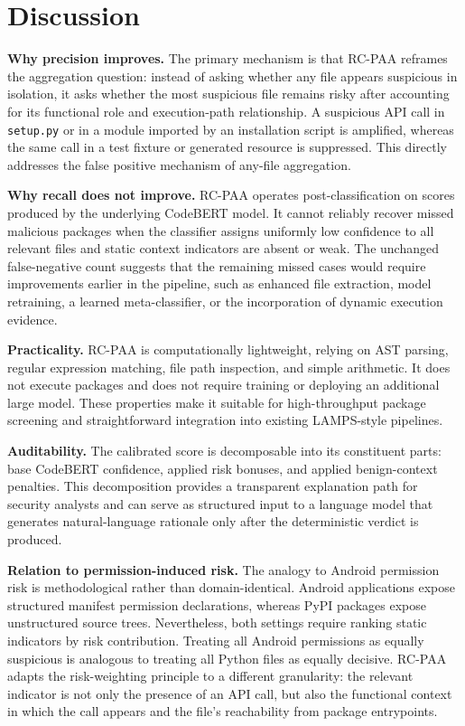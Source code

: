 \documentclass[conference,a4paper]{IEEEtran}
\newcommand{\rcpaa}{RC-PAA}
\newcommand{\codebert}{CodeBERT}
\begin{document}
\section{Discussion}

\textbf{Why precision improves.} The primary mechanism is that \rcpaa{} reframes the
aggregation question: instead of asking whether any file appears suspicious in isolation,
it asks whether the most suspicious file remains risky after accounting for its functional
role and execution-path relationship. A suspicious API call in \texttt{setup.py} or in
a module imported by an installation script is amplified, whereas the same call in a
test fixture or generated resource is suppressed. This directly addresses the false
positive mechanism of any-file aggregation.

\textbf{Why recall does not improve.} \rcpaa{} operates post-classification on scores
produced by the underlying \codebert{} model. It cannot reliably recover missed malicious
packages when the classifier assigns uniformly low confidence to all relevant files and
static context indicators are absent or weak. The unchanged false-negative count
suggests that the remaining missed cases would require improvements earlier in the
pipeline, such as enhanced file extraction, model retraining, a learned meta-classifier,
or the incorporation of dynamic execution evidence.

\textbf{Practicality.} \rcpaa{} is computationally lightweight, relying on AST
parsing, regular expression matching, file path inspection, and simple arithmetic. It
does not execute packages and does not require training or deploying an additional
large model. These properties make it suitable for high-throughput package screening and
straightforward integration into existing LAMPS-style pipelines.

\textbf{Auditability.} The calibrated score is decomposable into its constituent
parts: base \codebert{} confidence, applied risk bonuses, and applied benign-context
penalties. This decomposition provides a transparent explanation path for security
analysts and can serve as structured input to a language model that generates
natural-language rationale only after the deterministic verdict is produced.

\textbf{Relation to permission-induced risk.} The analogy to Android permission risk
is methodological rather than domain-identical. Android applications expose structured
manifest permission declarations, whereas PyPI packages expose unstructured source trees.
Nevertheless, both settings require ranking static indicators by risk contribution.
Treating all Android permissions as equally suspicious is analogous to treating all
Python files as equally decisive. \rcpaa{} adapts the risk-weighting principle to a
different granularity: the relevant indicator is not only the presence of an API call,
but also the functional context in which the call appears and the file's reachability
from package entrypoints.
\end{document}
